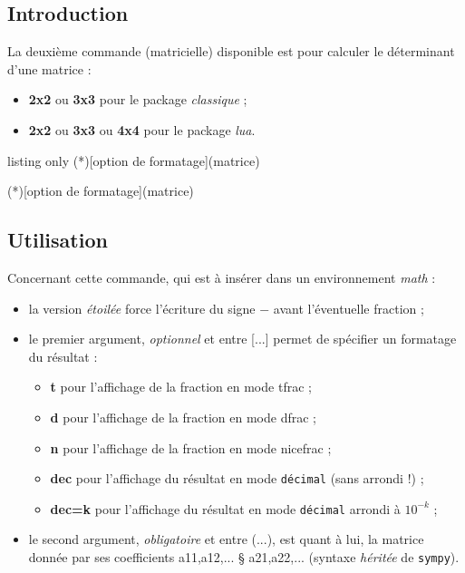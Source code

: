 \documentclass[a4paper,11pt]{article}
\newcommand\Cle[1]{{\bfseries\sffamily\textlangle #1\textrangle}}
\begin{document}
\subsection{Introduction}

\begin{cautionblock}
La deuxième commande (matricielle) disponible est pour calculer le déterminant d'une matrice :

\begin{itemize}
	\item \textbf{2x2} ou \textbf{3x3} pour le package \textit{classique} ;
	\item \textbf{2x2} ou \textbf{3x3} ou \textbf{4x4} pour le package \textit{lua}.
\end{itemize}
\vspace*{-\baselineskip}\leavevmode
\end{cautionblock}

\begin{PresentationCode}{listing only}
\DetMatrice(*)[option de formatage](matrice)

\DetMatricePY(*)[option de formatage](matrice)
\end{PresentationCode}

\subsection{Utilisation}

\begin{tipblock}
Concernant cette commande, qui est à insérer dans un environnement \textit{math} :

\begin{itemize}
	\item la version \textit{étoilée} force l'écriture du signe \og $-$ \fg{} avant l'éventuelle fraction ;
	\item le premier argument, \textit{optionnel} et entre \textsf{[...]} permet de spécifier un formatage du résultat :
	\begin{itemize}
		\item \Cle{t} pour l'affichage de la fraction en mode \textsf{tfrac} ;
		\item \Cle{d} pour l'affichage de la fraction en mode \textsf{dfrac} ;
		\item \Cle{n} pour l'affichage de la fraction en mode \textsf{nicefrac} ;
		\item \Cle{dec} pour l'affichage du résultat en mode \texttt{décimal} (sans arrondi !) ;
		\item \Cle{dec=k} pour l'affichage du résultat en mode \texttt{décimal} arrondi à $10^{-k}$ ;
	\end{itemize}
	\item le second argument, \textit{obligatoire} et entre \textsf{(...)}, est quant à lui, la matrice donnée par ses coefficients \textsf{a11,a12,... § a21,a22,...} (syntaxe \textit{héritée} de \texttt{sympy}).
\end{itemize}
\vspace*{-\baselineskip}\leavevmode
\end{tipblock}
\end{document}
